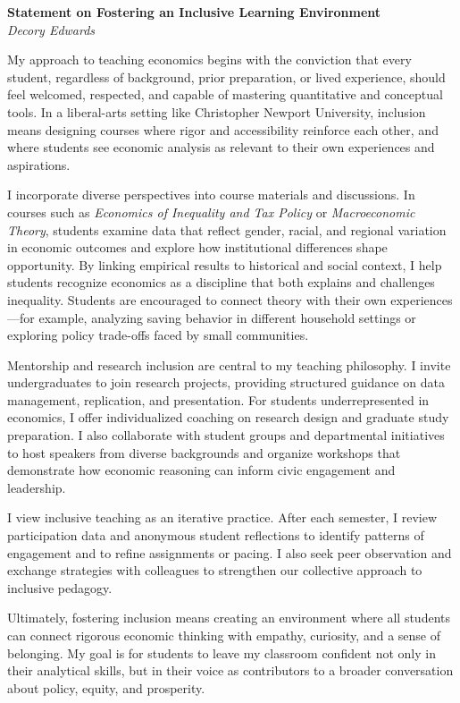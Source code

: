 \documentclass[11pt,letterpaper]{article}
\begin{document}
\begin{center}
    {\Large \textbf{Statement on Fostering an Inclusive Learning Environment}}\\[6pt]
    \textit{Decory Edwards}
\end{center}

My approach to teaching economics begins with the conviction that every student, regardless of background, prior preparation, or lived experience, should feel welcomed, respected, and capable of mastering quantitative and conceptual tools. In a liberal-arts setting like Christopher Newport University, inclusion means designing courses where rigor and accessibility reinforce each other, and where students see economic analysis as relevant to their own experiences and aspirations.

I incorporate diverse perspectives into course materials and discussions. In courses such as \textit{Economics of Inequality and Tax Policy} or \textit{Macroeconomic Theory}, students examine data that reflect gender, racial, and regional variation in economic outcomes and explore how institutional differences shape opportunity. By linking empirical results to historical and social context, I help students recognize economics as a discipline that both explains and challenges inequality. Students are encouraged to connect theory with their own experiences—for example, analyzing saving behavior in different household settings or exploring policy trade-offs faced by small communities.

Mentorship and research inclusion are central to my teaching philosophy. I invite undergraduates to join research projects, providing structured guidance on data management, replication, and presentation. For students underrepresented in economics, I offer individualized coaching on research design and graduate study preparation. I also collaborate with student groups and departmental initiatives to host speakers from diverse backgrounds and organize workshops that demonstrate how economic reasoning can inform civic engagement and leadership.

I view inclusive teaching as an iterative practice. After each semester, I review participation data and anonymous student reflections to identify patterns of engagement and to refine assignments or pacing. I also seek peer observation and exchange strategies with colleagues to strengthen our collective approach to inclusive pedagogy.

Ultimately, fostering inclusion means creating an environment where all students can connect rigorous economic thinking with empathy, curiosity, and a sense of belonging. My goal is for students to leave my classroom confident not only in their analytical skills, but in their voice as contributors to a broader conversation about policy, equity, and prosperity.
\end{document}
